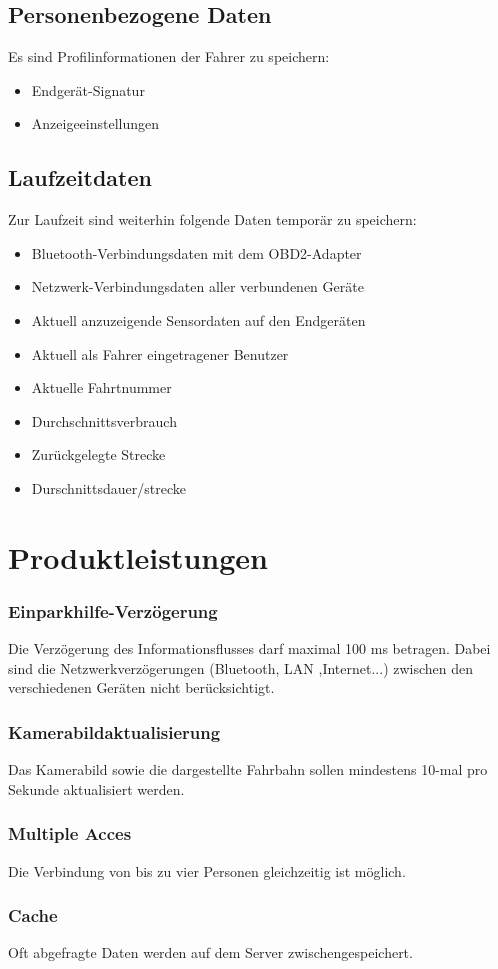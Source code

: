 \documentclass[pflichtenheft.tex]{subfiles}
\begin{document}
\section{\mkd Personenbezogene Daten}
Es sind Profilinformationen der Fahrer zu speichern:
\begin{itemize}
\item
Endgerät-Signatur
\item
Anzeigeeinstellungen

\end{itemize}

\section{\mkd Laufzeitdaten}
Zur Laufzeit sind weiterhin folgende Daten temporär zu speichern:
\begin{itemize}
\item Bluetooth-Verbindungsdaten mit dem OBD2-Adapter
\item Netzwerk-Verbindungsdaten aller verbundenen Geräte
\item Aktuell anzuzeigende Sensordaten auf den Endgeräten
\item Aktuell als Fahrer eingetragener Benutzer
\item Aktuelle Fahrtnummer
\item Durchschnittsverbrauch
\item Zurückgelegte Strecke
\item Durschnittsdauer/strecke

\end{itemize}



\chapter{Produktleistungen}

\subsection{\mkl Einparkhilfe-Verzögerung}
Die Verzögerung des Informationsflusses darf maximal 100 ms betragen. Dabei sind die Netzwerkverzögerungen (Bluetooth, LAN ,Internet...) zwischen den verschiedenen Geräten nicht berücksichtigt. 

\subsection{\mkl Kamerabildaktualisierung}
Das Kamerabild sowie die dargestellte Fahrbahn sollen mindestens 10-mal pro Sekunde aktualisiert werden.

\subsection{\mkl Multiple Acces} Die Verbindung von bis zu vier Personen gleichzeitig ist möglich.

\subsection{\mkl Cache} Oft abgefragte Daten werden auf dem Server zwischengespeichert.
\end{document}
